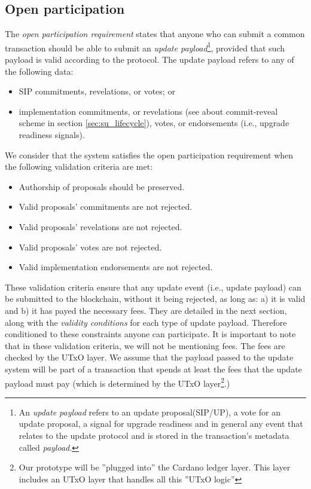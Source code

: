 \subsection{Open participation}\label{sec:open_participation}
The \emph{open participation requirement} states that anyone who can submit a
common transaction should be able to submit an \emph{update 
	payload}\footnote{An \emph{update payload} refers to an update 
	proposal(SIP/UP), a 
	vote for an update proposal, a signal for upgrade readiness and in general 
	any 
	event that relates to the update protocol and is stored in the 
	transaction's 
	metadata called \emph{payload}.}, provided that such
payload is valid according to the protocol. The update payload refers to any of
the following data:
\begin{itemize}
	\item SIP commitments, revelations, or votes; or
	\item implementation commitments, or revelations (see about commit-reveal 
	scheme in section \ref{sec:su_lifecycle}), votes, or endorsements (i.e., 
	upgrade readiness signals).
\end{itemize}

We consider that the system satisfies the open participation requirement when
the following validation criteria are met:
\begin{itemize}
	\item Authorship of proposals should be preserved.
	\item Valid proposals' commitments are not rejected.
	\item Valid proposals' revelations are not rejected.
	\item Valid proposals' votes are not rejected.
	\item Valid implementation endorsements are not rejected.
\end{itemize}


These validation criteria ensure that any update event (i.e., update payload)
can be submitted to the blockchain, without it being rejected, as long as: a)
it is valid and b) it has payed the necessary fees.  They are detailed in the
next section, along with the
\emph{validity conditions} for each type of update payload. Therefore
conditioned to
these constraints anyone can participate.  It is important to
note that in these validation criteria, we will not be
mentioning fees. The fees are checked by the UTxO layer. We assume that the
payload passed to the update system will be part of a transaction that
spends at least the fees that the update payload must pay (which is determined
by the UTxO layer\footnote{Our prototype will be ''plugged into'' the Cardano
	ledger layer. This layer includes an UTxO layer that handles all this ''UTxO
	logic''}.)

